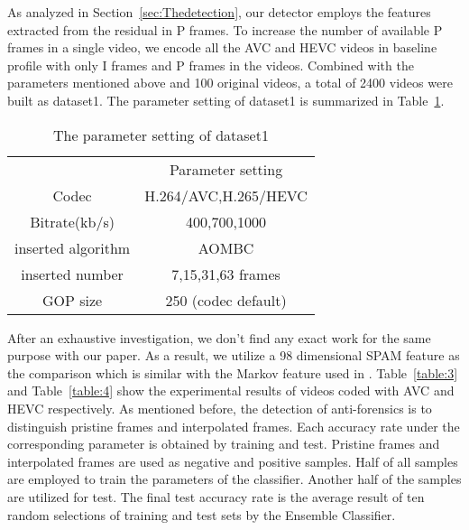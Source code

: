 \documentclass[pdftex,twocolumn,epjc3]{svjour3}          %
\begin{document}
As analyzed in Section~\ref{sec:Thedetection}, our detector employs the features extracted from the residual in P frames. To increase the number of available P frames in a single video, we encode all the AVC and HEVC videos in baseline profile with only I frames and P frames in the videos. Combined with the parameters mentioned above and 100 original videos, a total of 2400 videos were built as dataset1. The parameter setting of dataset1 is summarized in Table~\ref{table:2}.
\begin{table}[t]
\renewcommand\arraystretch{1.5}
    \caption{The parameter setting of dataset1}\label{table:2}
    \begin{center}
        \begin{tabular*}{7cm}{cc}
            \hline
            \ & Parameter setting\\
            \noalign{\smallskip}\hline\noalign{\smallskip}
            Codec & H.264/AVC,H.265/HEVC  \\
            Bitrate(kb/s) & 400,700,1000  \\
            inserted algorithm & AOMBC  \\
            inserted number & 7,15,31,63 frames\\
            GOP size & 250 (codec default)
            \\ \hline
        \end{tabular*}
    \end{center}
\end{table}
After an exhaustive investigation, we don't find any exact work for the same purpose with our paper. As a result, we utilize a 98 dimensional SPAM feature \cite{A19} as the comparison which is similar with the Markov feature used in \cite{A18}. Table~\ref{table:3} and Table~\ref{table:4} show the experimental results of videos coded with AVC and HEVC respectively. As mentioned before, the detection of anti-forensics is to distinguish pristine frames and interpolated frames. Each accuracy rate under the corresponding parameter is obtained by training and test. Pristine frames and interpolated frames are used as negative and positive samples. Half of all samples are employed to train the parameters of the classifier. Another half of the samples are utilized for test. The final test accuracy rate is the average result of ten random selections of training and test sets by the Ensemble Classifier.
\end{document}

